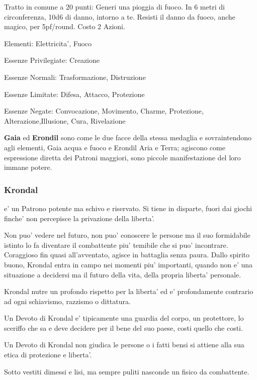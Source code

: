 \documentclass[a4paper,11pt,twoside,openany]{dndbook}
\begin{document}
{Tratto in comune a 20 punti: Generi una pioggia di fuoco. In 6 metri di circonferenza, 10d6 di danno, intorno a te. Resisti il danno da fuoco, anche magico, per 5pf/round. Costo 2 Azioni.

\bigskip

Elementi: Elettricita', Fuoco

\bigskip

Essenze Privilegiate: Creazione

Essenze Normali: Trasformazione, Distruzione

Essenze Limitate: Difesa, Attacco, Protezione

Essenze Negate: Convocazione, Movimento, Charme, Protezione, Alterazione,Illusione, Cura, Rivelazione

\bigskip

\textbf{Gaia} ed \textbf{Erondil} sono come le due facce della stessa medaglia e sovraintendono agli elementi, Gaia acqua e fuoco e Erondil Aria e Terra; agiscono come espressione diretta dei Patroni maggiori, sono piccole manifestazione del loro immane potere.

\subsubsection{Krondal}

\label{krondal}

e' un Patrono potente ma schivo e riservato. Si tiene in disparte, fuori dai giochi finche' non percepisce la privazione della liberta'.

Non puo' vedere nel futuro, non puo' conoscere le persone ma il suo formidabile istinto lo fa diventare il combattente piu' temibile che si puo' incontrare. Coraggioso fin quasi all'avventato, agisce in battaglia senza paura. Dallo spirito buono, Krondal entra in campo nei momenti piu' importanti, quando non e' una situazione a decidersi ma il futuro della vita, della propria liberta' personale.

Krondal nutre un profondo rispetto per la liberta' ed e' profondamente contrario ad ogni schiavismo, razzismo o dittatura.

Un Devoto di Krondal e' tipicamente una guardia del corpo, un protettore, lo sceriffo che sa e deve decidere per il bene del suo paese, costi quello che costi. 

Un Devoto di Krondal non giudica le persone o i fatti bensi si attiene alla sua etica di protezione e liberta'.

Sotto vestiti dimessi e lisi, ma sempre puliti nasconde un fisico da combattente.

}
\end{document}
